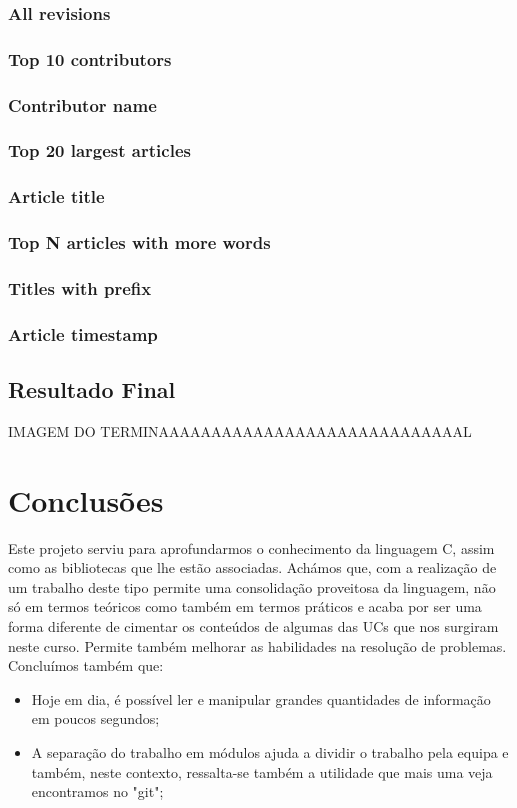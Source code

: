 \documentclass[a4paper]{article}
\begin{document}
\subsubsection{All revisions}
\subsubsection{Top 10 contributors}
\subsubsection{Contributor name}
\subsubsection{Top 20 largest articles}
\subsubsection{Article title}
\subsubsection{Top N articles with more words}
\subsubsection{Titles with prefix}
\subsubsection{Article timestamp}


\pagebreak

\subsection{Resultado Final}
IMAGEM DO TERMINAAAAAAAAAAAAAAAAAAAAAAAAAAAAAL
\begin{figure}[!htb]
\centering
\end{figure}


\section{Conclusões}
\label{sec:conclusao}
Este projeto serviu para aprofundarmos o conhecimento da linguagem C, assim como as bibliotecas que lhe estão associadas. Achámos que, com a realização de um trabalho deste tipo permite uma consolidação proveitosa da linguagem, não só em termos teóricos como também em termos práticos e acaba por ser uma forma diferente de cimentar os conteúdos de algumas das UCs que nos surgiram neste curso. Permite também melhorar as habilidades na resolução de problemas. Concluímos também que:

\begin{itemize} 
        \item Hoje em dia, é possível ler e manipular grandes quantidades de informação em poucos segundos;
 	    \item A separação do trabalho em módulos ajuda a dividir o trabalho pela equipa e também, neste contexto, ressalta-se também a utilidade que mais uma veja encontramos no "git";
\end{itemize}
\end{document}
